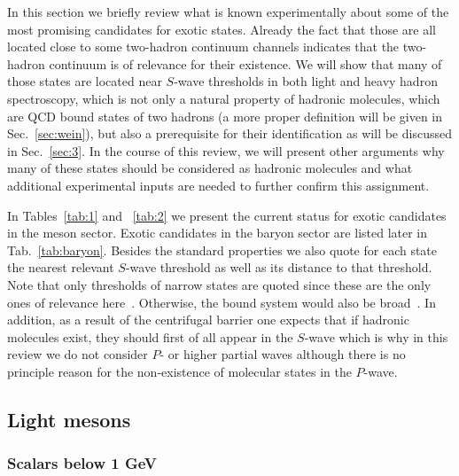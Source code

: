 In this section we briefly review what is known experimentally about some of the
most promising candidates for exotic states.
Already the fact that those are all located close to some two-hadron continuum
channels indicates that the two-hadron continuum is of relevance for their
existence. {We will show  that many of those states are located near
$S$-wave thresholds in both light and heavy hadron spectroscopy, which is
not only a natural property of hadronic molecules, which are QCD bound states
of two hadrons (a more
proper definition will be given in Sec.~\ref{sec:wein}), but also a
prerequisite for their identification as will be discussed in Sec.~\ref{sec:3}.} In the course of this
review, we will present other arguments why many of these states should be
considered as hadronic molecules and what additional experimental inputs are
needed to further confirm this assignment.



In Tables~\ref{tab:1} and ~\ref{tab:2} we present the current status for exotic
candidates in the meson sector. Exotic candidates in the baryon sector are
listed later in Tab.~\ref{tab:baryon}. Besides the standard properties we also
quote for each state the nearest relevant $S$-wave threshold  as well as its
distance to that threshold.
Note that only thresholds of narrow states are quoted since these are the only
ones of relevance here~\cite{Guo:2011dd}. Otherwise, the bound system would also
be broad~\cite{Filin:2010se}. In addition, as a result of the centrifugal
barrier one expects that if hadronic molecules exist, they should first of all
appear in the $S$-wave which is why in this review we do not consider $P$- or
higher partial waves although there is no principle reason for the non-existence
of molecular states in the $P$-wave.


\subsection{Light mesons}
\label{sec:2-lightmesons}


\subsubsection{Scalars below 1 GeV }


